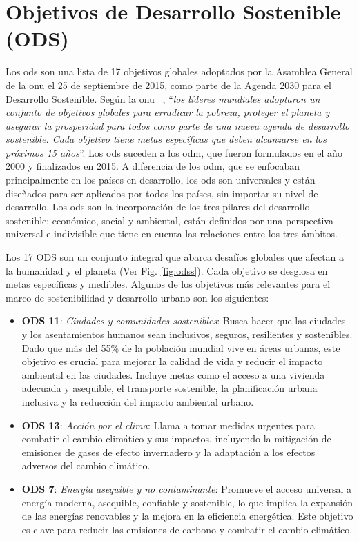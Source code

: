 \section{Objetivos de Desarrollo Sostenible (ODS)}
	Los \acrlong{ods} son una lista de 17 objetivos globales adoptados por la Asamblea General de la \acrfull{onu} el 25 de septiembre de 2015, como parte de la Agenda 2030 para el Desarrollo Sostenible. Según la \acrshort{onu} ~\cite{un_sustainable_development}, ``\textit{los líderes mundiales adoptaron un conjunto de objetivos globales para erradicar la pobreza, proteger el planeta y asegurar la prosperidad para todos como parte de una nueva agenda de desarrollo sostenible. Cada objetivo tiene metas específicas que deben alcanzarse en los próximos 15 años}''.		
	Los \acrshort{ods} suceden a los \acrfull{odm}, que fueron formulados en el año 2000 y finalizados en 2015. A diferencia de los \acrshort{odm}, que se enfocaban principalmente en los países en desarrollo, los \acrshort{ods} son universales y están diseñados para ser aplicados por todos los países, sin importar su nivel de desarrollo. Los \acrlong{ods} son la incorporación de los tres pilares del desarrollo sostenible: económico, social y ambiental, están definidos por una perspectiva universal e indivisible que tiene en cuenta las relaciones entre los tres ámbitos.
		
	Los 17 ODS son un conjunto integral que abarca desafíos globales que afectan a la humanidad y el planeta (Ver Fig. \ref{fig:odss}). Cada objetivo se desglosa en metas específicas y medibles. Algunos de los objetivos más relevantes para el marco de sostenibilidad y desarrollo urbano son los siguientes:
	\begin{itemize}
		\item \textbf{ODS 11}: \textit{Ciudades y comunidades sostenibles}: Busca hacer que las ciudades y los asentamientos humanos sean inclusivos, seguros, resilientes y sostenibles. Dado que más del 55\% de la población mundial vive en áreas urbanas, este objetivo es crucial para mejorar la calidad de vida y reducir el impacto ambiental en las ciudades. Incluye metas como el acceso a una vivienda adecuada y asequible, el transporte sostenible, la planificación urbana inclusiva y la reducción del impacto ambiental urbano.
		
		\item \textbf{ODS 13}: \textit{Acción por el clima}: Llama a tomar medidas urgentes para combatir el cambio climático y sus impactos, incluyendo la mitigación de emisiones de gases de efecto invernadero y la adaptación a los efectos adversos del cambio climático.
		
		\item \textbf{ODS 7}: \textit{Energía asequible y no contaminante}: Promueve el acceso universal a energía moderna, asequible, confiable y sostenible, lo que implica la expansión de las energías renovables y la mejora en la eficiencia energética. Este objetivo es clave para reducir las emisiones de carbono y combatir el cambio climático.
		
	\end{itemize}
	
